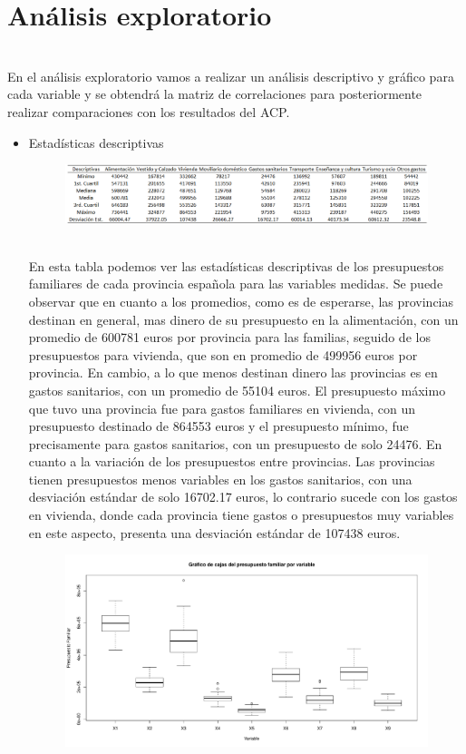 \documentclass[report,oneside]{revcoles}
\begin{document}
\section{Análisis exploratorio}
~\\En el análisis exploratorio vamos a realizar un análisis descriptivo y gráfico para cada variable y se obtendrá la matriz de correlaciones para posteriormente realizar comparaciones con los resultados del ACP.
\begin{itemize}
\item Estadísticas descriptivas

\begin{figure}[h!]
  \centering
  \includegraphics[scale=0.52]{FigurasUV/desc.png}
\end{figure}

~\\En esta tabla podemos ver las estadísticas descriptivas de los presupuestos familiares de cada provincia española para las variables medidas. Se puede observar que en cuanto a los promedios, como es de esperarse, las provincias destinan en general, mas dinero de su presupuesto en la alimentación, con un promedio de 600781 euros por provincia para las familias, seguido de los presupuestos para vivienda, que son en promedio de 499956 euros por provincia. En cambio, a lo que menos destinan dinero las provincias es en gastos sanitarios, con un promedio de 55104 euros. El presupuesto máximo que tuvo una provincia fue para gastos familiares en vivienda, con un presupuesto destinado de 864553 euros y el presupuesto mínimo, fue precisamente para gastos sanitarios, con un presupuesto de solo 24476. En cuanto a la variación de los presupuestos entre provincias. Las provincias tienen presupuestos menos variables en los gastos sanitarios, con una desviación estándar de solo 16702.17 euros, lo contrario sucede con los gastos en vivienda, donde cada provincia tiene gastos o presupuestos muy variables en este aspecto, presenta una desviación estándar de 107438 euros.
\begin{figure}[h!]
  \centering
  \includegraphics[scale=0.45]{FigurasUV/cajas.pdf}
\end{figure}


\end{itemize}
\end{document}

